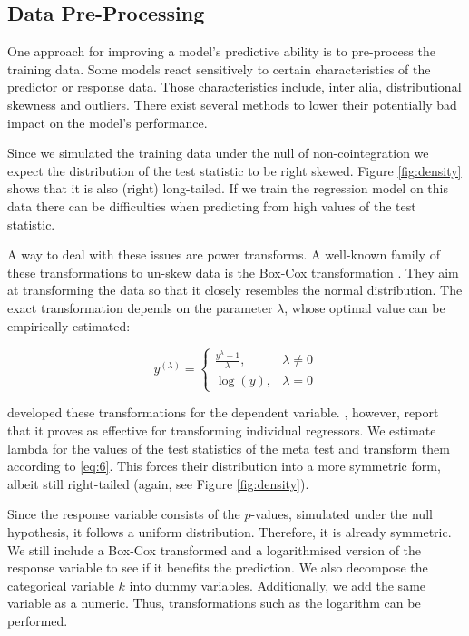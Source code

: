 \documentclass[12pt,a4paper]{article}
\begin{document}
\hypertarget{data-pre-processing}{%
\subsection{Data Pre-Processing}\label{data-pre-processing}}

One approach for improving a model's predictive ability is to
pre-process the training data. Some models react sensitively to certain
characteristics of the predictor or response data. Those characteristics
include, inter alia, distributional skewness and outliers. There exist
several methods to lower their potentially bad impact on the model's
performance.

Since we simulated the training data under the null of non-cointegration
we expect the distribution of the test statistic to be right skewed.
Figure \ref{fig:density} shows that it is also (right) long-tailed. If
we train the regression model on this data there can be difficulties
when predicting from high values of the test statistic.

A way to deal with these issues are power transforms. A well-known
family of these transformations to un-skew data is the Box-Cox
transformation \autocite{Boxcox_1964}. They aim at transforming the data
so that it closely resembles the normal distribution. The exact
transformation depends on the parameter \(\lambda\), whose optimal value
can be empirically estimated:

\begin{equation}
y^{(\lambda)} =
    \begin{cases}
    \frac{y^{\lambda} - 1}{\lambda}, & \lambda \neq 0 \\
    \log{(y)}, & \lambda = 0
    \end{cases}
\label{eq:6}
\end{equation}

\textcite{Boxcox_1964} developed these transformations for the dependent
variable. \textcite{Kuhn_2013}, however, report that it proves as
effective for transforming individual regressors. We estimate lambda for
the values of the test statistics of the meta test and transform them
according to \eqref{eq:6}. This forces their distribution into a more
symmetric form, albeit still right-tailed (again, see Figure
\ref{fig:density}).

Since the response variable consists of the \(p\)-values, simulated
under the null hypothesis, it follows a uniform distribution. Therefore,
it is already symmetric. We still include a Box-Cox transformed and a
logarithmised version of the response variable to see if it benefits the
prediction. We also decompose the categorical variable \(k\) into dummy
variables. Additionally, we add the same variable as a numeric. Thus,
transformations such as the logarithm can be performed.
\end{document}

